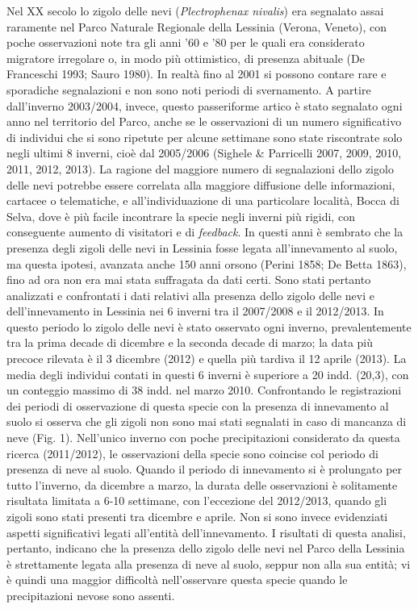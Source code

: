 Nel XX secolo lo zigolo delle nevi (\textit{Plectrophenax nivalis}) era
segnalato assai raramente nel Parco Naturale Regionale della Lessinia
(Verona, Veneto), con poche osservazioni note tra gli anni
'60 e '80 per le quali era
considerato migratore irregolare o, in modo pi\`u ottimistico, di
presenza abituale (De Franceschi 1993; Sauro 1980). In realt\`a fino al
2001 si possono contare rare e sporadiche segnalazioni e non sono noti
periodi di svernamento. A partire dall{\textquoteright}inverno
2003/2004, invece, questo passeriforme artico \`e stato segnalato ogni
anno nel territorio del Parco, anche se le osservazioni di un numero
significativo di individui che si sono ripetute per alcune settimane
sono state riscontrate solo negli ultimi 8 inverni, cio\`e dal
2005/2006 (Sighele \& Parricelli 2007, 2009, 2010, 2011, 2012, 2013).
La ragione del maggiore numero di segnalazioni dello zigolo delle nevi
potrebbe essere correlata alla maggiore diffusione delle informazioni,
cartacee o telematiche, e all{\textquoteright}individuazione di una
particolare localit\`a, Bocca di Selva, dove \`e pi\`u facile
incontrare la specie negli inverni pi\`u rigidi, con conseguente
aumento di visitatori e di \textit{feedback}. In questi anni \`e
sembrato che la presenza degli zigoli delle nevi in Lessinia fosse
legata all{\textquoteright}innevamento al suolo, ma questa ipotesi,
avanzata anche 150 anni orsono (Perini 1858; De Betta 1863), fino ad
ora non era mai stata suffragata da dati certi. Sono stati pertanto
analizzati e confrontati i dati relativi alla presenza dello zigolo
delle nevi e dell{\textquoteright}innevamento in Lessinia nei 6 inverni
tra il 2007/2008 e il 2012/2013. In questo periodo lo zigolo delle nevi
\`e stato osservato ogni inverno, prevalentemente tra la prima decade
di dicembre e la seconda decade di marzo; la data pi\`u precoce
rilevata \`e il 3 dicembre (2012) e quella pi\`u tardiva il 12 aprile
(2013). La media degli individui contati in questi 6 inverni \`e
superiore a 20 indd. (20,3), con un conteggio massimo di 38 indd. nel
marzo 2010. Confrontando le registrazioni dei periodi di osservazione
di questa specie con la presenza di innevamento al suolo si osserva che
gli zigoli non sono mai stati segnalati in caso di mancanza di neve
(Fig. 1). Nell{\textquoteright}unico inverno con poche precipitazioni
considerato da questa ricerca (2011/2012), le osservazioni della specie
sono coincise col periodo di presenza di neve al suolo. Quando il
periodo di innevamento si \`e prolungato per tutto
l{\textquoteright}inverno, da dicembre a marzo, la durata delle
osservazioni \`e solitamente risultata limitata a 6-10 settimane, con
l{\textquoteright}eccezione del 2012/2013, quando gli zigoli sono stati
presenti tra dicembre e aprile. Non si sono invece evidenziati aspetti
significativi legati all{\textquoteright}entit\`a
dell{\textquoteright}innevamento. I risultati di questa analisi,
pertanto, indicano che la presenza dello zigolo delle nevi nel Parco
della Lessinia \`e strettamente legata alla presenza di neve al suolo,
seppur non alla sua entit\`a; vi \`e quindi una maggior difficolt\`a
nell{\textquoteright}osservare questa specie quando le precipitazioni
nevose sono assenti.

